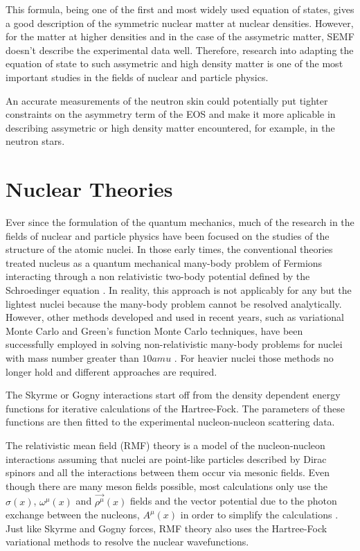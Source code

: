\indent This formula, being one of the first and most widely used equation of states, gives a good description of the symmetric nuclear matter at nuclear densities. However, for the matter at higher densities and in the case of the assymetric matter, SEMF doesn't describe the experimental data well. Therefore, research into adapting the equation of state to such assymetric and high density matter is one of the most important studies in the fields of nuclear and particle physics.

\indent An accurate measurements of the neutron skin could potentially put tighter constraints on the asymmetry term of the EOS and make it more aplicable in describing assymetric or high density matter encountered, for example, in the neutron stars.

\section{Nuclear Theories}

\indent Ever since the formulation of the quantum mechanics, much of the research in the fields of nuclear and particle physics have been focused on the studies of the structure of the atomic nuclei. In those early times, the conventional theories treated nucleus as a quantum mechanical many-body problem of Fermions interacting through a non relativistic two-body potential defined by the Schroedinger equation \cite{ring}. In reality, this approach is not applicably for any but the lightest nuclei because the many-body problem cannot be resolved analytically. However, other methods developed and used in recent years, such as variational Monte Carlo and Green's function Monte Carlo techniques, have been successfully employed in solving non-relativistic many-body problems for nuclei with mass number greater than $10amu$ \cite{carlson, pieper}. For heavier nuclei those methods no longer hold and different approaches are required.

\indent The Skyrme \cite{skyrme} or Gogny \cite{gogny} interactions start off from the density dependent energy functions for iterative calculations of the Hartree-Fock. The parameters of these functions are then fitted to the experimental nucleon-nucleon scattering data.

\indent The relativistic mean field (RMF) theory is a model of the nucleon-nucleon interactions assuming that nuclei are point-like particles described by Dirac spinors and all the interactions between them occur via mesonic fields. Even though there are many meson fields possible, most calculations only use the $\sigma(x)$, $\omega^{\mu}(x)$ and $\vec{\rho^{\mu}}(x)$ fields and the vector potential due to the photon exchange between the nucleons, $A^{\mu}(x)$ in order to simplify the calculations \cite{meucci}. Just like Skyrme and Gogny forces, RMF theory also uses the Hartree-Fock variational methods to resolve the nuclear wavefunctions.

